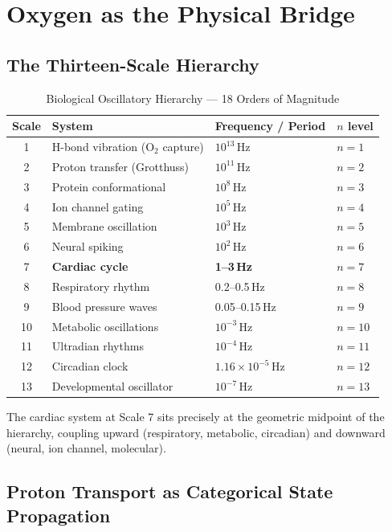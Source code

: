\documentclass[10pt,twocolumn,a4paper]{article}
\theoremstyle{definition}
\begin{document}
\section{Oxygen as the Physical Bridge}
\label{sec:oxygen}

\subsection{The Thirteen-Scale Hierarchy}

\begin{table}[H]
\centering
\caption{Biological Oscillatory Hierarchy — 18 Orders of Magnitude}
\label{tab:hierarchy}
\begin{tabular}{clll}
\toprule
\textbf{Scale} & \textbf{System} & \textbf{Frequency / Period} & \textbf{$n$ level}\\
\midrule
1 & H-bond vibration (O$_2$ capture) & $10^{13}$\,Hz & $n=1$\\
2 & Proton transfer (Grotthuss) & $10^{11}$\,Hz & $n=2$\\
3 & Protein conformational & $10^{8}$\,Hz & $n=3$\\
4 & Ion channel gating & $10^{5}$\,Hz & $n=4$\\
5 & Membrane oscillation & $10^{3}$\,Hz & $n=5$\\
6 & Neural spiking & $10^{2}$\,Hz & $n=6$\\
7 & \textbf{Cardiac cycle} & \textbf{1--3\,Hz} & $n=7$\\
8 & Respiratory rhythm & 0.2--0.5\,Hz & $n=8$\\
9 & Blood pressure waves & 0.05--0.15\,Hz & $n=9$\\
10 & Metabolic oscillations & $10^{-3}$\,Hz & $n=10$\\
11 & Ultradian rhythms & $10^{-4}$\,Hz & $n=11$\\
12 & Circadian clock & $1.16 \times 10^{-5}$\,Hz & $n=12$\\
13 & Developmental oscillator & $10^{-7}$\,Hz & $n=13$\\
\bottomrule
\end{tabular}
\end{table}

The cardiac system at Scale 7 sits precisely at the geometric midpoint
of the hierarchy, coupling upward (respiratory, metabolic, circadian)
and downward (neural, ion channel, molecular).

\subsection{Proton Transport as Categorical State Propagation}
\end{document}
